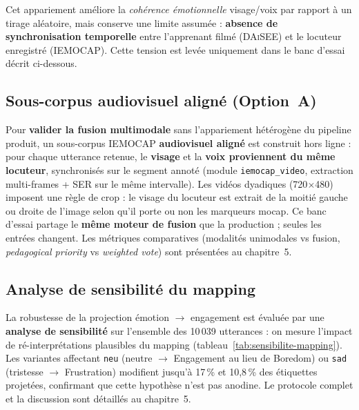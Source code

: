 Cet appariement améliore la \emph{cohérence émotionnelle} visage/voix par rapport
à un tirage aléatoire, mais conserve une limite assumée : \textbf{absence de
synchronisation temporelle} entre l'apprenant filmé (\textsc{DAiSEE}) et le locuteur
enregistré (\textsc{IEMOCAP}). Cette tension est levée uniquement dans le banc
d'essai décrit ci-dessous.

\subsection{Sous-corpus audiovisuel aligné (Option~A)}
\label{subsec:option-a}

Pour \textbf{valider la fusion multimodale} sans l'appariement hétérogène du
pipeline produit, un sous-corpus \textsc{IEMOCAP} \textbf{audiovisuel aligné} est
construit hors ligne : pour chaque utterance retenue, le \textbf{visage} et la
\textbf{voix proviennent du même locuteur}, synchronisés sur le segment annoté
(module \texttt{iemocap\_video}, extraction multi-frames + SER sur le même intervalle).
Les vidéos dyadiques (720$\times$480) imposent une règle de crop : le visage du
locuteur est extrait de la moitié gauche ou droite de l'image selon qu'il porte
ou non les marqueurs mocap. Ce banc d'essai partage le \textbf{même moteur de fusion}
que la production ; seules les entrées changent. Les métriques comparatives (modalités
unimodales vs fusion, \emph{pedagogical priority} vs \emph{weighted vote}) sont
présentées au chapitre~5.

\subsection{Analyse de sensibilité du mapping}
\label{subsec:sensibilite-mapping}

La robustesse de la projection émotion $\rightarrow$ engagement est évaluée par une
\textbf{analyse de sensibilité} sur l'ensemble des 10\,039 utterances : on mesure
l'impact de ré-interprétations plausibles du mapping (tableau~\ref{tab:sensibilite-mapping}).
Les variantes affectant \texttt{neu} (neutre $\rightarrow$ Engagement au lieu de
Boredom) ou \texttt{sad} (tristesse $\rightarrow$ Frustration) modifient jusqu'à
17\,\% et 10,8\,\% des étiquettes projetées, confirmant que cette hypothèse n'est
pas anodine. Le protocole complet et la discussion sont détaillés au chapitre~5.


